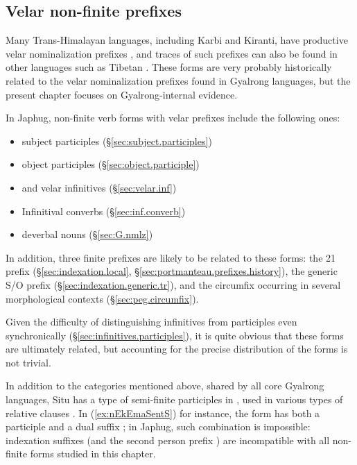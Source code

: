 \subsection{Velar non-finite prefixes} \label{sec:velar.nmlz.history}
Many Trans-Himalayan languages, including Karbi and Kiranti, have productive velar nominalization prefixes \citep{konnerth16gV}, and traces of such prefixes can also be found in other languages such as Tibetan \citep{jacques14snom}. These forms are very probably historically related to the velar nominalization prefixes found in Gyalrong languages, but the present chapter focuses on Gyalrong-internal evidence.

In Japhug, non-finite verb forms with velar prefixes include the following ones:

\begin{itemize}
\item {} subject participles (§\ref{sec:subject.participles})
\item {} object participles (§\ref{sec:object.participle})
\item {} and  velar infinitives (§\ref{sec:velar.inf})
\item Infinitival converbs (§\ref{sec:inf.converb})
\item {} deverbal nouns (§\ref{sec:G.nmlz})
\end{itemize}

In addition, three finite prefixes are likely to be related to these forms: the 2\fl{}1  prefix (§\ref{sec:indexation.local}, §\ref{sec:portmanteau.prefixes.history}), the generic S/O  prefix (§\ref{sec:indexation.generic.tr}), and the circumfix  occurring in several morphological contexts (§\ref{sec:peg.circumfix}).

Given the difficulty of distinguishing infinitives from participles even synchronically (§\ref{sec:infinitives.participles}), it is quite obvious that these forms are ultimately related, but accounting for the precise distribution of the forms is not trivial.

In addition to the categories mentioned above, shared by all core Gyalrong languages, Situ has a type of semi-finite participles in , used in various types of relative clauses \citep{jacksonlin07}. In (\ref{ex:nEkEmaSentS}) for instance, the form  has both a participle  and a dual suffix ; in Japhug, such combination is impossible: indexation suffixes (and the second person prefix ) are incompatible with all non-finite forms studied in this chapter. 

